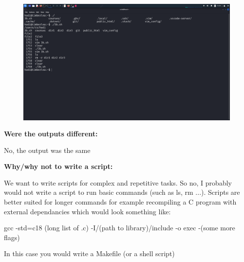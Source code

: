 \documentclass{article}
\numberwithin{equation}{subsection}
\begin{document}
	\begin{figure}[H]
			\includegraphics[width=400pt]{images/3b.png}
	\end{figure}

	\vspace{10pt}
	\textbf{Were the outputs different:}
	\par{
		No, the output was the same
	}

	\textbf{Why/why not to write a script:}
	
	\par{
		We want to write scripts for complex and repetitive tasks. So no, I probably would not
		write a script to run basic commands (such as ls, rm ...). Scripts are better
		suited for longer commands for example recompiling a C program with 
		external dependancies which would look something like:
		\begin{center}
			
		gcc -std=c18 (long list of .c) -I/(path to library)/include -o exec -(some more flags)
		\end{center}
		In this case you would write a Makefile (or a shell script)

	}
\end{document}
